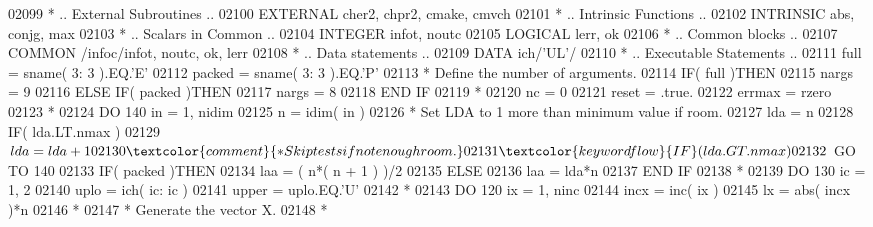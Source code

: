 \begin{DoxyCode}
02099 \textcolor{comment}{*     .. External Subroutines ..}
02100       \textcolor{keywordtype}{EXTERNAL}           cher2, chpr2, cmake, cmvch
02101 \textcolor{comment}{*     .. Intrinsic Functions ..}
02102       \textcolor{keywordtype}{INTRINSIC}          abs, conjg, max
02103 \textcolor{comment}{*     .. Scalars in Common ..}
02104       \textcolor{keywordtype}{INTEGER}            infot, noutc
02105       \textcolor{keywordtype}{LOGICAL}            lerr, ok
02106 \textcolor{comment}{*     .. Common blocks ..}
02107       \textcolor{keyword}{COMMON}             /infoc/infot, noutc, ok, lerr
02108 \textcolor{comment}{*     .. Data statements ..}
02109       \textcolor{keyword}{DATA}               ich/\textcolor{stringliteral}{'UL'}/
02110 \textcolor{comment}{*     .. Executable Statements ..}
02111       full = sname( 3: 3 ).EQ.\textcolor{stringliteral}{'E'}
02112       packed = sname( 3: 3 ).EQ.\textcolor{stringliteral}{'P'}
02113 \textcolor{comment}{*     Define the number of arguments.}
02114       \textcolor{keywordflow}{IF}( full )\textcolor{keywordflow}{THEN}
02115          nargs = 9
02116       \textcolor{keywordflow}{ELSE} \textcolor{keywordflow}{IF}( packed )\textcolor{keywordflow}{THEN}
02117          nargs = 8
02118 \textcolor{keywordflow}{      END IF}
02119 \textcolor{comment}{*}
02120       nc = 0
02121       reset = .true.
02122       errmax = rzero
02123 \textcolor{comment}{*}
02124       \textcolor{keywordflow}{DO} 140 in = 1, nidim
02125          n = idim( in )
02126 \textcolor{comment}{*        Set LDA to 1 more than minimum value if room.}
02127          lda = n
02128          \textcolor{keywordflow}{IF}( lda.LT.nmax )
02129      $      lda = lda + 1
02130 \textcolor{comment}{*        Skip tests if not enough room.}
02131          \textcolor{keywordflow}{IF}( lda.GT.nmax )
02132      $      \textcolor{keywordflow}{GO TO} 140
02133          \textcolor{keywordflow}{IF}( packed )\textcolor{keywordflow}{THEN}
02134             laa = ( n*( n + 1 ) )/2
02135          \textcolor{keywordflow}{ELSE}
02136             laa = lda*n
02137 \textcolor{keywordflow}{         END IF}
02138 \textcolor{comment}{*}
02139          \textcolor{keywordflow}{DO} 130 ic = 1, 2
02140             uplo = ich( ic: ic )
02141             upper = uplo.EQ.\textcolor{stringliteral}{'U'}
02142 \textcolor{comment}{*}
02143             \textcolor{keywordflow}{DO} 120 ix = 1, ninc
02144                incx = inc( ix )
02145                lx = abs( incx )*n
02146 \textcolor{comment}{*}
02147 \textcolor{comment}{*              Generate the vector X.}
02148 \textcolor{comment}{*}

\end{DoxyCode}
